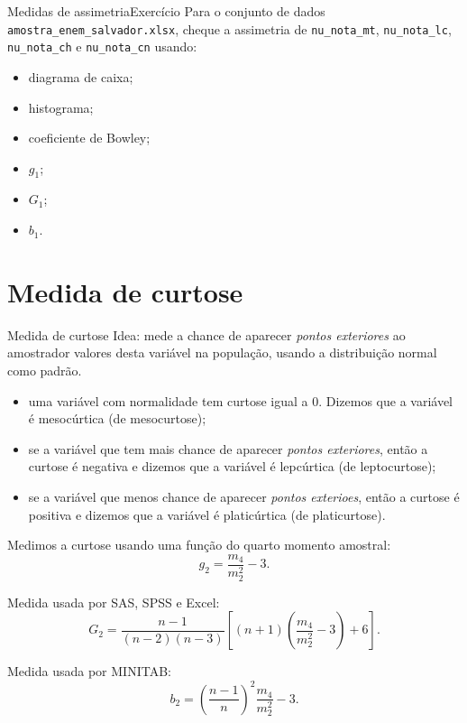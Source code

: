 \documentclass[
  10pt,
  ignorenonframetext,
]{beamer}
\providecommand{\tightlist}{%
  \setlength{\itemsep}{0pt}\setlength{\parskip}{0pt}}\usepackage{longtable,booktabs,array}
\begin{document}
\begin{frame}[fragile]{Medidas de assimetria\newline Exercício}
\protect\hypertarget{medidas-de-assimetriaexercuxedcio}{}
Para o conjunto de dados \texttt{amostra\_enem\_salvador.xlsx}, cheque a
assimetria de \texttt{nu\_nota\_mt}, \texttt{nu\_nota\_lc},
\texttt{nu\_nota\_ch} e \texttt{nu\_nota\_cn} usando:

\begin{itemize}
\tightlist
\item
  diagrama de caixa;
\item
  histograma;
\item
  coeficiente de Bowley;
\item
  \(g_1\);
\item
  \(G_1\);
\item
  \(b_1\).
\end{itemize}
\end{frame}

\hypertarget{medida-de-curtose}{%
\section{Medida de curtose}\label{medida-de-curtose}}

\begin{frame}{Medida de curtose}
\protect\hypertarget{medida-de-curtose-1}{}
Idea: mede a chance de aparecer \emph{pontos exteriores} ao amostrador
valores desta variável na população, usando a distribuição normal como
padrão.

\begin{itemize}
\tightlist
\item
  uma variável com normalidade tem curtose igual a 0. Dizemos que a
  variável é mesocúrtica (de mesocurtose);
\item
  se a variável que tem mais chance de aparecer \emph{pontos
  exteriores}, então a curtose é negativa e dizemos que a variável é
  lepcúrtica (de leptocurtose);
\item
  se a variável que menos chance de aparecer \emph{pontos exterioes},
  então a curtose é positiva e dizemos que a variável é platicúrtica (de
  platicurtose).
\end{itemize}

Medimos a curtose usando uma função do quarto momento amostral: \[
g_2 = \frac{m_4}{m_2^2} - 3.
\]
\end{frame}

\begin{frame}
Medida usada por SAS, SPSS e Excel: \[
G_2 = \frac{n-1}{(n-2)(n-3)}\left[ (n+1) \left(\frac{m_4}{m_2^2}-3\right) +6  \right].
\]

Medida usada por MINITAB: \[
b_2 = \left( \frac{n-1}{n} \right)^2 \frac{m_4}{m_2^2}-3.
\]
\end{frame}
\end{document}
